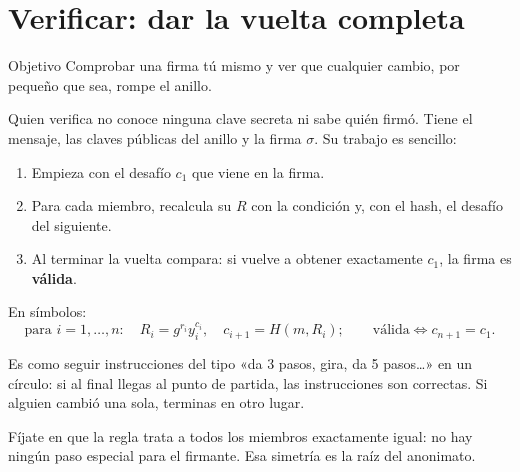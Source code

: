 \documentclass[11pt,a4paper]{article}
\theoremstyle{definition}
\theoremstyle{plain}
\theoremstyle{remark}
\begin{document}
\section{Verificar: dar la vuelta completa}\label{sec:verificar}

\begin{nota}{Objetivo}
Comprobar una firma tú mismo y ver que cualquier cambio, por pequeño que sea, rompe
el anillo.
\end{nota}

Quien verifica no conoce ninguna clave secreta ni sabe quién firmó. Tiene el
mensaje, las claves públicas del anillo y la firma $\sigma$. Su trabajo es
sencillo:

\begin{enumerate}[leftmargin=2em,itemsep=0.2em]
  \item Empieza con el desafío $c_1$ que viene en la firma.
  \item Para cada miembro, recalcula su $R$ con la condición  y, con el
    hash, el desafío del siguiente.
  \item Al terminar la vuelta compara: si vuelve a obtener exactamente $c_1$, la
    firma es \textbf{válida}.
\end{enumerate}
En símbolos:
\begin{equation}\label{eq:verificar}
  \text{para } i = 1,\dots,n:\quad R_i = g^{r_i} y_i^{c_i},\quad c_{i+1} = H(m, R_i);
  \qquad \text{válida} \iff c_{n+1} = c_1 .
\end{equation}

Es como seguir instrucciones del tipo «da 3 pasos, gira, da 5 pasos…» en un
círculo: si al final llegas al punto de partida, las instrucciones son correctas.
Si alguien cambió una sola, terminas en otro lugar.

Fíjate en que la regla trata a todos los miembros exactamente igual: no hay ningún
paso especial para el firmante. Esa simetría es la raíz del anonimato.
\end{document}
